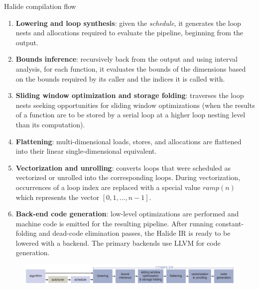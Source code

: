 \documentclass[8pt,a4paper,oneside,hidelinks,aspectratio=169,dvipsnames]{beamer}
\newcommand{\code}[1]{\texttt{\detokenize{#1}}}
\begin{document}
\begin{frame}{Halide compilation flow}
  \fontsize{6pt}{7.2}\selectfont
  \begin{enumerate}
    \item \textbf{Lowering and loop synthesis}: given the \textit{schedule}, it generates the loop nests and allocations required to evaluate the pipeline, beginning from the output.
    \item \textbf{Bounds inference}: recursively back from the output and using interval analysis, for each function, it evaluates the bounds of the dimensions based on the bounds required by its caller and the indices it is called with.
    \item \textbf{Sliding window optimization and storage folding}: traverses the loop nests seeking opportunities for sliding window optimizations (when the results of a function are to be stored by a serial loop at a higher loop nesting level than its computation).
    \item \textbf{Flattening}: multi-dimensional loads, stores, and allocations are flattened into their linear single-dimensional equivalent.
    \item \textbf{Vectorization and unrolling}: converts loops that were scheduled as vectorized or unrolled into the corresponding loops. During vectorization, occurrences of a loop index are replaced with a special value $ramp(n)$ which represents the vector $[0, 1, \ldots, n-1]$.
    \item \textbf{Back-end code generation}: low-level optimizations are performed and machine code is emitted for the resulting pipeline. After running constant-folding and dead-code elimination passes, the Halide IR is ready to be lowered with a \code{CodeGen} backend. The primary backends use LLVM for code generation.
  \end{enumerate}

  \begin{figure}[H]
    \centering
    \includegraphics[width=\textwidth]{img/halide-compiler-flow.png}
  \end{figure}

\end{frame}
\end{document}
